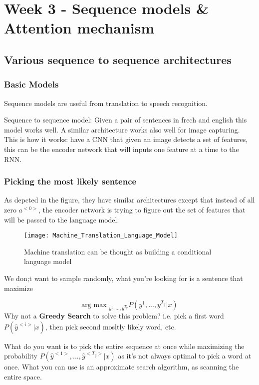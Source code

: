 \section{Week 3 - Sequence models \& Attention mechanism}
\subsection{Various sequence to sequence architectures}
\subsubsection{Basic Models}
Sequence models are useful from translation to speech recognition.

Sequence to sequence model:
Given a pair of sentences in frech and english this model works well. A similar architecture works also well for image capturing. This is how it works: have a CNN that given an image detects a set of features, this can be the encoder network that will inputs one feature at a time to the RNN.

\subsubsection{Picking the most likely sentence}
As depcted in the figure, they have similar architectures except that instead of all zero $a^{<0>}$, the encoder network is trying to figure out the set of features that will be passed to the language model.


\begin{figure}[H]
\centering
\texttt{[image: Machine\_Translation\_Language\_Model]}
\caption{Machine translation can be thought as building a conditional language model}
\end{figure}
We don;t want to sample randomly, what you're looking for is a sentence that maximize

\begin{equation*}
\text{arg max }_{y^{1}, ..., y^{T_y}} P( y^{1}, ..., y^{T_y} | x)    
\end{equation*}
Why not a \textbf{Greedy Search} to solve this problem? i.e. pick a first word $P(\hat{y}^{<i>} | x)$, then pick second mosltly likely word, etc.

What do you want is to pick the entire sequence at once while maximizing the probability $P(\hat{y}^{<1>}, ..., \hat{y}^{<T_y>} | x)$ as it's not always optimal to pick a word at once. What you can use is an approximate search algorithm, as scanning the entire space.

